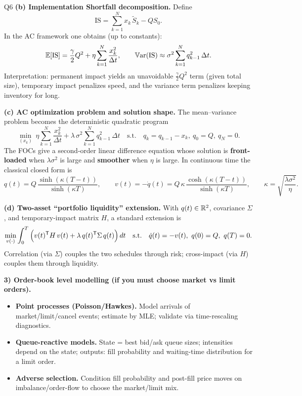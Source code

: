 \begin{solutionbox}{Q6}
\smallskip
\textbf{(b) Implementation Shortfall decomposition.} Define
\[
\mathrm{IS}=\sum_{k=1}^N x_k\,\tilde S_k - Q S_0.
\]
In the AC framework one obtains (up to constants):
\[
\mathbb{E}[\mathrm{IS}]=\frac{\gamma}{2}Q^2+\eta\sum_{k=1}^N \frac{x_k^2}{\Delta t},
\qquad
\mathbb{V}\mathrm{ar}(\mathrm{IS})\approx \sigma^2\sum_{k=1}^N q_{k-1}^2\,\Delta t.
\]
Interpretation: permanent impact yields an unavoidable \(\frac{\gamma}{2}Q^2\) term (given total size), temporary impact penalizes speed, and the variance term penalizes keeping inventory for long.

\smallskip
\textbf{(c) AC optimization problem and solution shape.} The mean--variance problem becomes the deterministic quadratic program
\[
\min_{(x_k)}\ \eta\sum_{k=1}^N \frac{x_k^2}{\Delta t} + \lambda\,\sigma^2\sum_{k=1}^N q_{k-1}^2\,\Delta t
\quad\text{s.t.}\quad q_k=q_{k-1}-x_k,\ q_0=Q,\ q_N=0.
\]
The FOCs give a second-order linear difference equation whose solution is \textbf{front-loaded} when \(\lambda\sigma^2\) is large and \textbf{smoother} when \(\eta\) is large. In continuous time the classical closed form is
\[
q(t)=Q\,\frac{\sinh(\kappa (T-t))}{\sinh(\kappa T)},
\qquad
v(t)=-\dot q(t)=Q\,\kappa\,\frac{\cosh(\kappa (T-t))}{\sinh(\kappa T)},
\qquad
\kappa=\sqrt{\frac{\lambda\sigma^2}{\eta}}.
\]

\smallskip
\textbf{(d) Two-asset ``portfolio liquidity'' extension.} With \(q(t)\in\mathbb{R}^2\), covariance \(\Sigma\), and temporary-impact matrix \(H\), a standard extension is
\[
\min_{v(\cdot)}\int_0^T \Big(v(t)^{\mathsf{T}} H\,v(t)+\lambda\,q(t)^{\mathsf{T}}\Sigma\,q(t)\Big)\,dt
\quad\text{s.t.}\quad \dot q(t)=-v(t),\ q(0)=Q,\ q(T)=0.
\]
Correlation (via \(\Sigma\)) couples the two schedules through risk; cross-impact (via \(H\)) couples them through liquidity.

\medskip
\textbf{3) Order-book level modelling (if you must choose market vs limit orders).}
\begin{itemize}[leftmargin=*]
  \item \textbf{Point processes (Poisson/Hawkes).} Model arrivals of market/limit/cancel events; estimate by MLE; validate via time-rescaling diagnostics.
  \item \textbf{Queue-reactive models.} State = best bid/ask queue sizes; intensities depend on the state; outputs: fill probability and waiting-time distribution for a limit order.
  \item \textbf{Adverse selection.} Condition fill probability and post-fill price moves on imbalance/order-flow to choose the market/limit mix.
\end{itemize}


\end{solutionbox}
